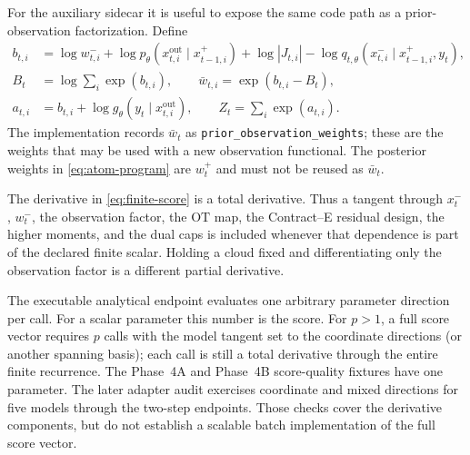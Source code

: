 \documentclass[11pt]{article}
\newcommand{\OT}{\ensuremath{\mathrm{OT}}}
\begin{document}
For the auxiliary sidecar it is useful to expose the same code path as a
prior-observation factorization.  Define
\begin{align}
 b_{t,i} &= \log w_{t,i}^{-}
      +\log p_\theta(x_{t,i}^{\mathrm{out}}\mid x_{t-1,i}^{+})
      +\log |J_{t,i}|
      -\log q_{t,\theta}(x_{t,i}^{-}\mid x_{t-1,i}^{+},y_t),\\
 B_t &= \log\sum_i\exp(b_{t,i}),\qquad
 \bar w_{t,i}=\exp(b_{t,i}-B_t),\\
 a_{t,i} &= b_{t,i}+\log g_\theta(y_t\mid x_{t,i}^{\mathrm{out}}),\qquad
 Z_t=\sum_i\exp(a_{t,i}).
 \label{eq:prior-observation-factorization}
\end{align}
The implementation records $\bar w_t$ as
\texttt{prior\_observation\_weights}; these are the weights that may be
used with a new observation functional.  The posterior weights in
\eqref{eq:atom-program} are $w_t^+$ and must not be reused as $\bar w_t$.

The derivative in \eqref{eq:finite-score} is a total derivative.  Thus a
tangent through $x_t^{-}$, $w_t^{-}$, the observation factor, the \OT{} map,
the Contract--E residual design, the higher moments, and the dual caps is
included whenever that dependence is part of the declared finite scalar.
Holding a cloud fixed and differentiating only the observation factor is a
different partial derivative.

The executable analytical endpoint evaluates one arbitrary parameter
direction per call.  For a scalar parameter this number is the score.  For
$p>1$, a full score vector requires $p$ calls with the model tangent set to
the coordinate directions (or another spanning basis); each call is still a
total derivative through the entire finite recurrence.  The Phase~4A and Phase~4B score-quality fixtures have one parameter.
The later adapter audit exercises coordinate and mixed directions for five
models through the two-step endpoints. Those checks cover the derivative
components, but do not establish a scalable batch implementation of the full
score vector.
\end{document}
